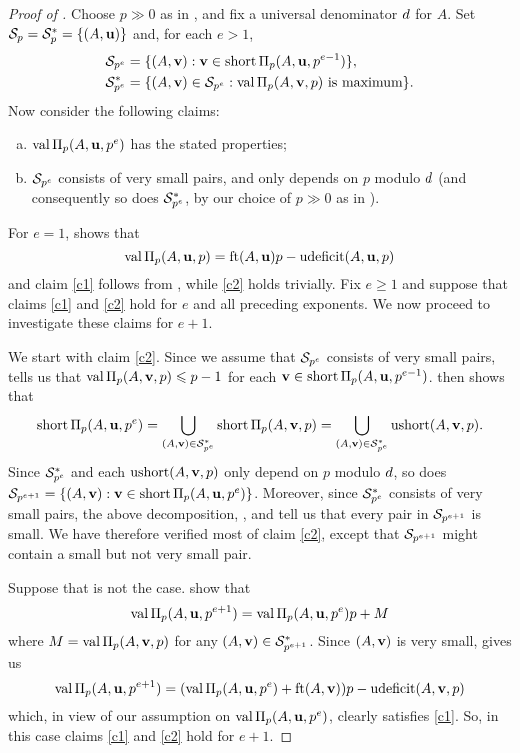 \documentclass{amsart}
\begin{document}
\begin{proof}[Proof of ]
   Choose $p \gg 0$ as in , and fix a universal denominator $\denom$ for $A$.
   Set $\S_p = \S^*_p = \{ (A,\vv{u}) \}$ and, for each $e > 1$,
   \begin{align*}
   \S_{p^{e}} &= \{ (A,\vv{v}):  \vv{v} \in \short \IP_p(A,\vv{u},p^{e-1}) \},\\
   \S^*_{p^{e}} &= \{ (A,\vv{v}) \in \S_{p^{e}}:  \val\IP_p(A,\vv{v},p)\text{ is maximum} \}.
   \end{align*}
   Now consider the following claims:
   \begin{enumerate}[(a),leftmargin=*]
      \item\label{c1} $\val \IP_p(A,\vv{u},p^e)$ has the stated properties;
      \item\label{c2} $\S_{p^e}$ consists of very small pairs, and only depends on $p$ modulo $\denom$ (and consequently so does $\S^*_{p^e}$, by our choice of $p\gg 0$ as in ).
   \end{enumerate}
   For $e=1$,  shows that
   \[ \val \IP_p(A,\vv{u},p) = \ft{A}{\vv{u}}p-\udeficit(A,\vv{u},p)\]
   and claim \ref{c1} follows from , while \ref{c2} holds trivially.
   Fix $e\ge 1$ and suppose that claims \ref{c1} and \ref{c2} hold for $e$ and all preceding exponents.
   We now proceed to investigate these claims for $e+1$.

   We start with claim \ref{c2}.
   Since we assume that $\S_{p^e}$ consists of very small pairs,  tells us that $\val\IP_p(A,\vv{v},p) \le p-1$ for each $\vv{v} \in \short \IP_p(A,\vv{u},p^{e-1})$.
    then shows that
   \[\short \IP_p(A,\vv{u},p^{e}) = \bigcup_{(A,\vv{v}) \in \S^*_{p^e}} \short \IP_p(A,\vv{v}, p)
      = \bigcup_{(A,\vv{v}) \in \S^*_{p^e}} \ushort(A,\vv{v}, p).\]
   Since $\S^*_{p^e}$ and each $\ushort(A,\vv{v}, p)$ only depend on $p$ modulo $\denom$, so does $\S_{p^{e+1}} = \{(A,\vv{v}): \vv{v}\in \short \IP_p(A,\vv{u},p^{e})\}$.
   Moreover, since $\S^*_{p^e}$ consists of very small pairs, the above decomposition, , and  tell us that every pair in $\S_{p^{e+1}}$ is small.
   We have therefore verified most of claim \ref{c2}, except that $\S_{p^{e+1}}$ might contain a small but not very small pair.

   Suppose that is not the case.
    show that
   \begin{equation}
      \label{recurrence: E}
      \val \IP_p(A,\vv{u},p^{e+1}) = \val \IP_p(A,\vv{u},p^e)p + M
   \end{equation}
   where $M = \val\IP_p(A,\vv{v},p)$ for any  $(A,\vv{v}) \in \S^*_{p^{e+1}}$.
   Since $(A,\vv{v})$ is very small,  gives us
   \[\val \IP_p(A,\vv{u},p^{e+1}) = (\val \IP_p(A,\vv{u},p^e) + \ft{A}{\vv{v}}) p - \udeficit(A,\vv{v},p)\]
   which, in view of our assumption on $\val \IP_p(A,\vv{u},p^e)$, clearly satisfies \ref{c1}.
   So, in this case claims \ref{c1} and \ref{c2} hold for $e+1$.


\end{proof}
\end{document}
